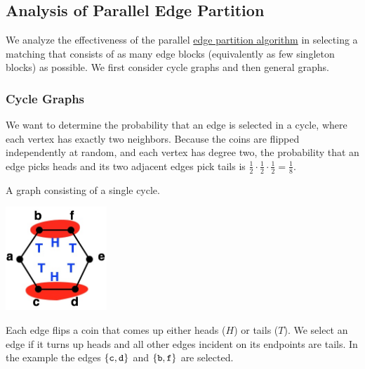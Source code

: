 \subsection{Analysis of Parallel Edge Partition}
\label{sec:edge::partition::analysis}

We analyze the effectiveness of the parallel 
%
\href{alg:graphcon::edge::parallel-matching}{edge partition algorithm}
%
in selecting a matching that consists of as many edge blocks
(equivalently as few singleton blocks) as possible.
%
We first consider cycle graphs and then general graphs.


\subsubsection{Cycle Graphs}
\label{sec:edge::partition::analysis::cycle}

\begin{gram}
\label{graphcon::edge::analysis::cycle::pr}
We want to determine the probability that an edge is selected in a
cycle, where each vertex has exactly two neighbors. 
%
Because the coins are flipped independently at random, and each vertex
has degree two, the probability that an edge picks heads and its two
adjacent edges pick tails is $\frac{1}{2} \cdot \frac{1}{2} \cdot
\frac{1}{2} = \frac{1}{8}$.
\end{gram}

\begin{example} 
\label{ex:graphcon::edge::analysis::cycle::1}
A graph consisting of a single cycle.    
  \begin{center}
  \includegraphics[width=1.5in]{./graph-contraction/media-edge/cycle-graph.jpg}
  \end{center}
Each edge flips a coin that comes up either heads ($H$) or tails
($T$).  
%
We select an edge if it turns up heads and all other edges
incident on its endpoints are tails.  In the example the edges
$\left\{ \texttt{c},\texttt{d} \right\}$ and $\left\{ \texttt{b},\texttt{f} \right\}$ are
selected.
\end{example}


